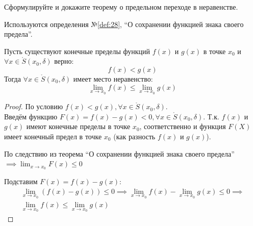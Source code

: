 \begin{question}
    Сформулируйте и докажите теорему о предельном переходе в неравенстве.
\end{question}
\begin{used}
    Используются определения №\ref{def:28}, ``О сохранении функцией знака своего предела''.
\end{used}
\begin{theorem}
    Пусть существуют конечные пределы функций $f(x)$ и  $g(x)$ в точке $x_0$ и $\forall x \in \mathring{S}(x_0, \delta)$ верно: \[
        f(x) < g(x)
    \]
    Тогда $\forall x \in \mathring{S}(x_0, \delta)$ имеет место неравенство: \[
        \lim_{x \to x_0} f(x) \le \lim_{x \to x_0} g(x)
    \]
\end{theorem}
\begin{proof}
    По условию $f(x) < g(x), \forall x \in \mathring{S}(x_0, \delta)$. \\
    Введём функцию $F(x) = f(x) - g(x) < 0, \forall x \in \mathring{S}(x_0, \delta)$. 
    Т.к. $f(x)$ и $g(x)$ имеют конечные пределы в точке $x_0$, соответственно и функция $F(X)$ имеет конечный предел в точке $x_0$ (как разность $f(x)$ и $g(x)$).
  
    По следствию из теорема ``О сохранении функцией знака своего предела'' $\implies \lim_{x \to x_0} F(x) \le 0$ 
  
    Подставим $F(x) = f(x) - g(x)$:
    \begin{gather*}
        \lim_{x \to x_0} \left( f(x) - g(x) \right) \le 0 \implies \lim_{x \to x_0} f(x) - \lim_{x \to x_0} g(x) \le 0 \implies \\
        \lim_{x \to x_0} f(x) \le \lim_{x \to x_0} g(x) 
    \end{gather*}
\end{proof}
\pagebreak



